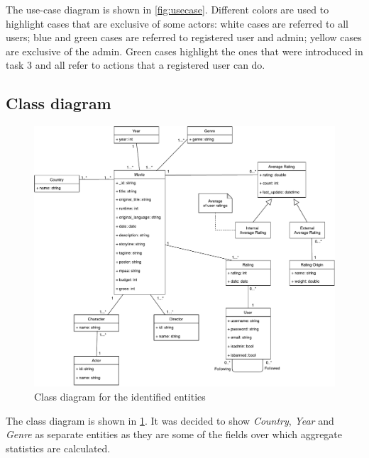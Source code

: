 \documentclass[11pt]{article}
\begin{document}
The use-case diagram is shown in \cref{fig:usecase}. Different colors are used to highlight cases that are exclusive of some actors: white cases are referred to all users; blue and green cases are referred to registered user and admin; yellow cases are exclusive of the admin. Green cases highlight the ones that 
were introduced in task 3 and all refer to actions that a registered user can
do.

\subsection{Class diagram}

\begin{figure}[h!]
    \centering
    \includegraphics[width=\textwidth]{figs/class_diagram.pdf}
    \caption{Class diagram for the identified entities}
    \label{fig:class_diagram}
\end{figure}

The class diagram is shown in \cref{fig:class_diagram}. It was decided to show \emph{Country}, \emph{Year} and \emph{Genre} as separate entities as they are some of the fields over which aggregate statistics are calculated.


\clearpage
\end{document}

